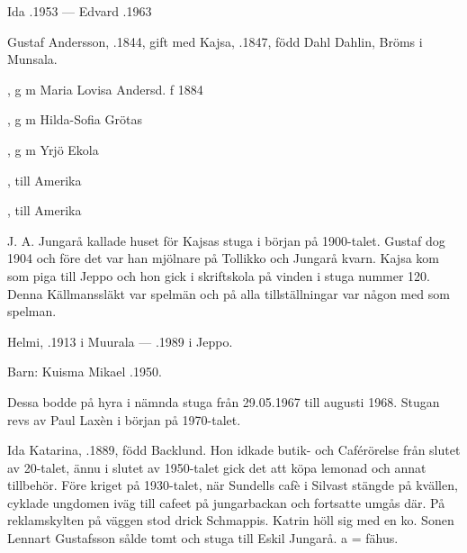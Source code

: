 Ida .1953  ---  Edvard .1963


Gustaf Andersson, .1844, gift med Kajsa, .1847, född Dahl Dahlin, Bröms i Munsala.
\begin{jhchildren}
  \item {}, g m Maria Lovisa Andersd. f 1884
  \item {}, g m Hilda-Sofia Grötas
  \item {}, g m Yrjö Ekola
  \item {}
  \item {}, till Amerika
  \item {}, till Amerika
  \item {}
\end{jhchildren}
J. A. Jungarå kallade huset för Kajsas stuga i början på 1900-talet. Gustaf dog 1904 och före det var han mjölnare på Tollikko och Jungarå kvarn. Kajsa kom som piga till Jeppo och hon gick i skriftskola på vinden i stuga nummer 120. Denna Källmanssläkt var spelmän och på alla tillställningar var någon med som spelman.





Helmi, .1913 i Muurala  ---  .1989 i Jeppo.

Barn: Kuisma Mikael .1950.

Dessa bodde på hyra i nämnda stuga från 29.05.1967 till augusti 1968. Stugan revs av Paul Laxèn i början på 1970-talet.



Ida Katarina, .1889, född Backlund. Hon idkade butik- och Caférörelse från slutet av 20-talet, ännu i slutet av 1950-talet gick det att köpa lemonad och annat tillbehör. Före kriget på 1930-talet, när Sundells cafè i Silvast stängde på kvällen, cyklade ungdomen iväg till cafeet på jungarbackan och fortsatte umgås där. På reklamskylten på väggen stod drick Schmappis. Katrin höll sig med en ko. Sonen Lennart Gustafsson sålde tomt och stuga till Eskil Jungarå. a  = fähus.

